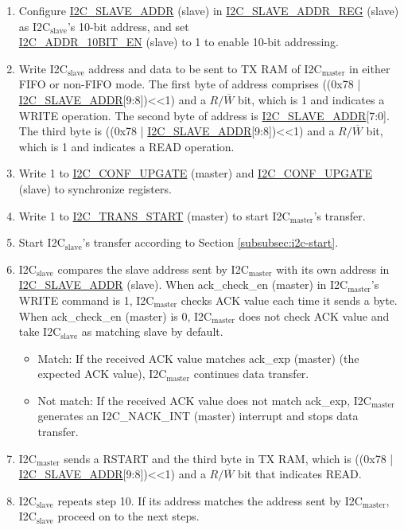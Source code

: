 \documentclass[main\_\_EN.tex]{subfiles}
\begin{document}
\begin{enumerate}
\item Configure \hyperref[fielddesc:I2CSLAVEADDR]{I2C\_SLAVE\_ADDR} (slave) in \hyperref[regdesc:I2CSLAVEADDRREG]{I2C\_SLAVE\_ADDR\_REG} (slave) as I2C$_\text{slave}$'s 10-bit address, and set \\\hyperref[fielddesc:I2CADDR10BITEN]{I2C\_ADDR\_10BIT\_EN} (slave) to 1 to enable 10-bit addressing.
\item Write I2C$_\text{slave}$ address and data to be sent to TX RAM of I2C$_\text{master}$ in either FIFO or non-FIFO mode. The first byte of address comprises ((0x78 | \hyperref[fielddesc:I2CSLAVEADDR]{I2C\_SLAVE\_ADDR}[9:8])<<1) and a $R/\overline W$ bit, which is 1 and indicates a WRITE operation. The second byte of address is \hyperref[fielddesc:I2CSLAVEADDR]{I2C\_SLAVE\_ADDR}[7:0]. The third byte is ((0x78 | \hyperref[fielddesc:I2CSLAVEADDR]{I2C\_SLAVE\_ADDR}[9:8])<<1) and a $R/\overline W$ bit, which is 1 and indicates a READ operation.

\item Write 1 to \hyperref[fielddesc:I2CCONFUPGATE]{I2C\_CONF\_UPGATE} (master) and \hyperref[fielddesc:I2CCONFUPGATE]{I2C\_CONF\_UPGATE} (slave) to synchronize registers.
\item Write 1 to \hyperref[fielddesc:I2CTRANSSTART]{I2C\_TRANS\_START} (master) to start I2C$_\text{master}$'s transfer.
\item Start I2C$_\text{slave}$'s transfer according to Section \ref{subsubsec:i2c-start}.
\item I2C$_\text{slave}$ compares the slave address sent by I2C$_\text{master}$ with its own address in \hyperref[fielddesc:I2CSLAVEADDR]{I2C\_SLAVE\_ADDR} (slave). When ack\_check\_en (master) in I2C$_\text{master}$'s WRITE command is 1, I2C$_\text{master}$ checks ACK value each time it sends a byte. When ack\_check\_en (master) is 0, I2C$_\text{master}$ does not check ACK value and take I2C$_\text{slave}$ as matching slave by default.
\begin{itemize}
\item Match: If the received ACK value matches ack\_exp (master) (the expected ACK value), I2C$_\text{master}$ continues data transfer.
\item Not match: If the received ACK value does not match ack\_exp, I2C$_\text{master}$ generates an I2C\_NACK\_INT (master) interrupt and stops data transfer.
\end{itemize}

\item I2C$_\text{master}$ sends a RSTART and the third byte in TX RAM, which is ((0x78 | \hyperref[fielddesc:I2CSLAVEADDR]{I2C\_SLAVE\_ADDR}[9:8])<<1) and a $R/\overline W$ bit that indicates READ.
\item I2C$_\text{slave}$ repeats step 10. If its address matches the address sent by I2C$_\text{master}$, I2C$_\text{slave}$ proceed on to the next steps.


\end{enumerate}
\end{document}
